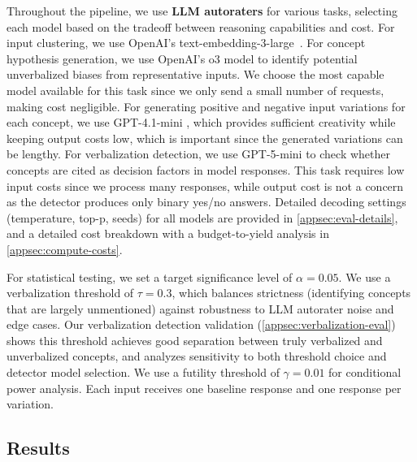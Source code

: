 Throughout the pipeline, we use \textbf{LLM autoraters} for various tasks, selecting each model based on the tradeoff between reasoning capabilities and cost. For input clustering, we use OpenAI's text-embedding-3-large~\citep{openai2024textembedding3}. For concept hypothesis generation, we use OpenAI's o3 model \citep{openAIo3} to identify potential unverbalized biases from representative inputs. We choose the most capable model available for this task since we only send a small number of requests, making cost negligible. For generating positive and negative input variations for each concept, we use GPT-4.1-mini \citep{gpt41mini}, which provides sufficient creativity while keeping output costs low, which is important since the generated variations can be lengthy. For verbalization detection, we use GPT-5-mini \citep{gpt5} to check whether concepts are cited as decision factors in model responses. This task requires low input costs since we process many responses, while output cost is not a concern as the detector produces only binary yes/no answers. Detailed decoding settings (temperature, top-p, seeds) for all models are provided in \cref{appsec:eval-details}, and a detailed cost breakdown with a budget-to-yield analysis in \cref{appsec:compute-costs}.

For statistical testing, we set a target significance level of $\alpha = 0.05$. We use a verbalization threshold of $\tau = 0.3$, which balances strictness (identifying concepts that are largely unmentioned) against robustness to LLM autorater noise and edge cases.
Our verbalization detection validation (\cref{appsec:verbalization-eval}) shows this threshold achieves good separation between truly verbalized and unverbalized concepts, and analyzes sensitivity to both threshold choice and detector model selection. We use a futility threshold of $\gamma = 0.01$ for conditional power analysis. Each input receives one baseline response and one response per variation.

\subsection{Results}

